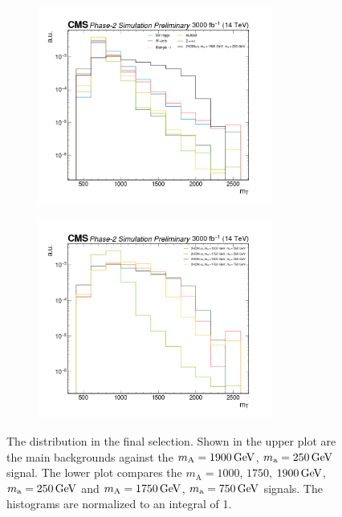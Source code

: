 \begin{figure}[ht]
    \centering
    \begin{subfigure}[b]{\textwidth}
        \includegraphics[width=0.845\textwidth]{Chapters/Signal_Extraction/shape_MT_backgrounds.png}
    \end{subfigure}
    \begin{subfigure}[b]{\textwidth}
        \includegraphics[width=0.845\textwidth]{Chapters/Signal_Extraction/shape_MT_signals.png}
    \end{subfigure}
\caption{The \mt distribution in the final selection. Shown in the upper plot are the main backgrounds against the $m_\mathrm{A} = \GeV{1900}$, $m_\mathrm{a} = \GeV{250}$  signal. The lower plot compares the $m_\mathrm{A} =1000$, $1750$, $\GeV{1900}$, $m_\mathrm{a} = \GeV{250}$ and $m_\mathrm{A} = \GeV{1750}$, $m_\mathrm{a} = \GeV{750}$ signals. The histograms are normalized to an integral of 1.}
\label{fig:mtshape}
\end{figure}

